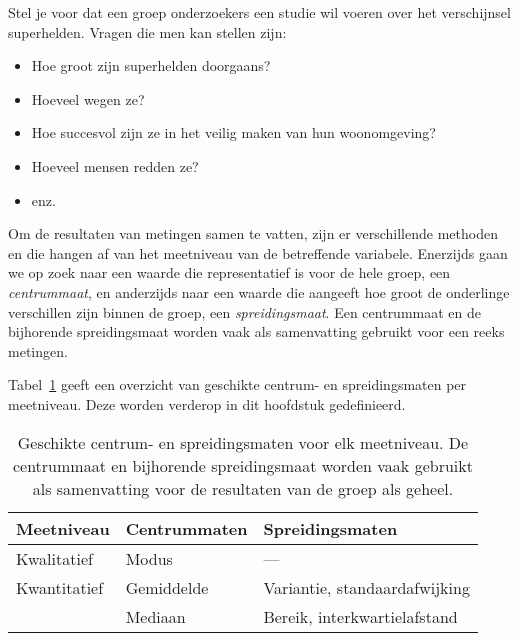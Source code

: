 Stel je voor dat een groep onderzoekers een studie wil voeren over het verschijnsel superhelden. Vragen die men kan stellen zijn:

\begin{itemize}
  \item Hoe groot zijn superhelden doorgaans?
  \item Hoeveel wegen ze?
  \item Hoe succesvol zijn ze in het veilig maken van hun woonomgeving?
  \item Hoeveel mensen redden ze?
  \item enz.
\end{itemize}

Om de resultaten van metingen samen te vatten, zijn er verschillende methoden en die hangen af van het meetniveau van de betreffende variabele. Enerzijds gaan we op zoek naar een waarde die representatief is voor de hele groep, een \emph{centrummaat}, en anderzijds naar een waarde die aangeeft hoe groot de onderlinge verschillen zijn binnen de groep, een \emph{spreidingsmaat}. Een centrummaat en de bijhorende spreidingsmaat worden vaak als samenvatting gebruikt voor een reeks metingen.

Tabel~\ref{tab:centrum-spreidingsmaten} geeft een overzicht van geschikte centrum- en spreidingsmaten per meetniveau. Deze worden verderop in dit hoofdstuk gedefinieerd.

\begin{table}
  \centering
  \begin{tabular}{lll}
  \toprule
 	\textbf{Meetniveau} & \textbf{Centrummaten} & \textbf{Spreidingsmaten}      \\
  \midrule
 	Kwalitatief         & Modus                 & ---                           \\
  \midrule
 	Kwantitatief        & Gemiddelde            & Variantie, standaardafwijking \\
	                    & Mediaan               & Bereik, interkwartielafstand  \\
  \bottomrule
  \end{tabular}
  \caption[Geschikte centrum- en spreidingsmaten voor elk meetniveau.]{Geschikte centrum- en spreidingsmaten voor elk meetniveau. De centrummaat en bijhorende spreidingsmaat worden vaak gebruikt als samenvatting voor de resultaten van de groep als geheel.}
  \label{tab:centrum-spreidingsmaten}
\end{table}


